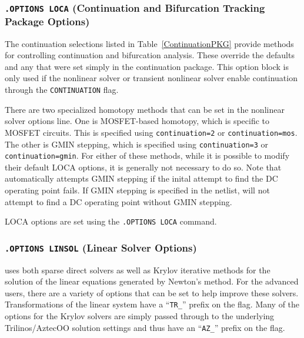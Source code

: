 


\subsubsection{\texttt{.OPTIONS LOCA} (Continuation and Bifurcation Tracking Package Options)}

The continuation selections listed in Table~\ref{ContinuationPKG}
provide methods for controlling continuation and bifurcation analysis.
These override the defaults and any that were set simply in the
continuation package.  This option block is only used if the nonlinear
solver or transient nonlinear solver enable continuation through the
\texttt{CONTINUATION} flag.

There are two specialized homotopy methods that can be set in the nonlinear
solver options line.  One is MOSFET-based homotopy, which is specific to MOSFET
circuits.  This is specified using \texttt{continuation=2} or
\texttt{continuation=mos}.  The other is GMIN stepping, which is specified
using \texttt{continuation=3} or \texttt{continuation=gmin}.  For either of
these methods, while it is possible to modify their default LOCA options, it is
generally not necessary to do so. Note that \Xyce{} automatically attempts GMIN
stepping if the inital attempt to find the DC operating point fails. If GMIN
stepping is specified in the netlist, \Xyce{} will not attempt to find a DC
operating point without GMIN stepping. 

LOCA options are set using the \texttt{.OPTIONS LOCA} command.



\subsubsection{\texttt{.OPTIONS LINSOL} (Linear Solver Options)}

\Xyce{} uses both sparse direct
solvers as well as Krylov iterative
methods
for the solution of the linear equations generated by Newton's method.
For the advanced users, there are a variety of options that can be set
to help improve these solvers.  Transformations of the linear system
have a ``\verb+TR_+'' prefix on the flag.  Many of the options for the
Krylov solvers are simply passed through to the underlying
Trilinos/AztecOO
solution settings and thus have an ``\verb+AZ_+'' prefix on the flag.

